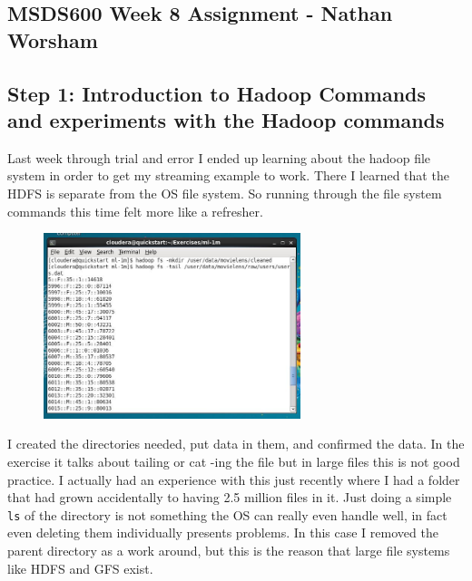 \documentclass[10pt]{article}
\begin{document}
\subsection*{MSDS600 Week 8 Assignment - Nathan Worsham}
\subsection*{Step 1: Introduction to Hadoop Commands and experiments with the Hadoop commands }
Last week through trial and error I ended up learning about the hadoop file system in order to get my streaming example to work. There I learned that the HDFS is separate from the OS file system. So running through the file system commands this time felt more like a refresher.
\begin{figure}
\includegraphics[width=7.5cm, scale=0.45]{week8_tail.jpg}
\end{figure}
\par I created the directories needed, put data in them, and confirmed the data. In the exercise it talks about tailing or cat -ing the file but in large files this is not good practice. I actually had an experience with this just recently where I had a folder that had grown accidentally to having 2.5 million files in it. Just doing a simple \verb|ls| of the directory is not something the OS can really even handle well, in fact even deleting them individually presents problems. In this case I removed the parent directory as a work around, but this is the reason that large file systems like HDFS and GFS exist.  
\end{document}
